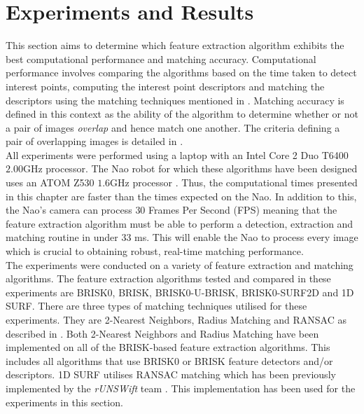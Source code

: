 \chapter{Experiments and Results}
\label{sec:experimentsResults}
This section aims to determine which feature extraction algorithm exhibits the best  computational performance and matching accuracy. Computational performance involves comparing the algorithms based on the time taken to detect interest points, computing the interest point descriptors and matching the descriptors using the matching techniques mentioned in . Matching accuracy is defined in this context as the ability of the algorithm to determine whether or not a pair of images \textit{overlap} and hence match one another. The criteria defining a pair of overlapping images is detailed in .\\

All experiments were performed using a laptop with an Intel Core 2 Duo T6400 $2.00$GHz processor. The Nao robot for which these algorithms have been designed uses an ATOM Z530 $1.6$GHz processor \citep{NaoHead}. Thus, the computational times presented in this chapter are faster than the times expected on the Nao. In addition to this, the Nao's camera can process $30$ Frames Per Second (FPS) meaning that the feature extraction algorithm must be able to perform a detection, extraction and matching routine in under $33$ ms. This will enable the Nao to process every image which is crucial to obtaining robust, real-time matching performance. \\

The experiments were conducted on a variety of feature extraction and matching algorithms. The feature extraction algorithms tested and compared in these experiments are BRISK0, BRISK, BRISK0-U-BRISK, BRISK0-SURF2D and 1D SURF. There are three types of matching techniques utilised for these experiments. They are 2-Nearest Neighbors, Radius Matching and RANSAC as described in . Both 2-Nearest Neighbors and Radius Matching have been implemented on all of the BRISK-based feature extraction algorithms. This includes all algorithms that use BRISK0 or BRISK feature detectors and/or descriptors. 1D SURF utilises RANSAC matching which has been previously implemented by the \textit{rUNSWift} team \citep{Anderson}. This implementation has been used for the experiments in this section.\\ 


